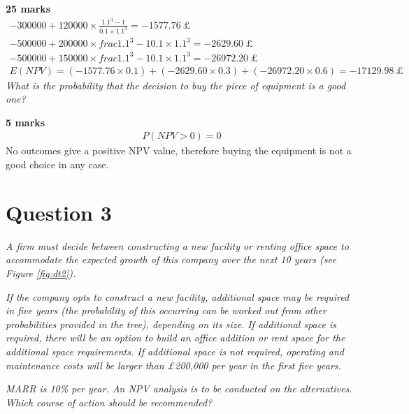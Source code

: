 \textbf{25 marks}
\begin{gather}
    -300000+120000\times \frac{1.1^3-1}{0.1\times 1.1^3} = \SI{-1577.76}{\pounds}\\
    -500000+200000\times frac{1.1^3-1}{0.1\times 1.1^3} = \SI{-2629.60}{\pounds}\\
    -500000+150000\times frac{1.1^3-1}{0.1\times 1.1^3} = \SI{-26972.20}{\pounds}\\
    E\left(NPV\right) = \left(-1577.76\times 0.1\right) + \left(-2629.60\times 0.3\right) + \left(-26972.20\times 0.6\right) = \SI{-17129.98}{\pounds}
\end{gather}
\textit{What is the probability that the decision to buy the piece of equipment is a good one?}

\textbf{5 marks}
\begin{gather}
    P\left(NPV > 0\right) = 0
\end{gather}
No outcomes give a positive NPV value, therefore buying the equipment is not a good choice in any case.
\section{Question 3}
\textit{A firm must decide between constructing a new facility or renting office space to accommodate the expected growth of this company over the next 10 years (see Figure \ref{fig:dt2}).}

\textit{If the company opts to construct a new facility, additional space may be required in five years (the probability of this occurring can be worked out from other probabilities provided in the tree), depending on its size. If additional space is required, there will be an option to build an office addition or rent space for the additional space requirements. If additional space is not required, operating and maintenance costs will be larger than \pounds 200,000 per year in the first five years.}

\textit{MARR is 10\% per year. An NPV analysis is to be conducted on the alternatives. Which course of action should be recommended? }

